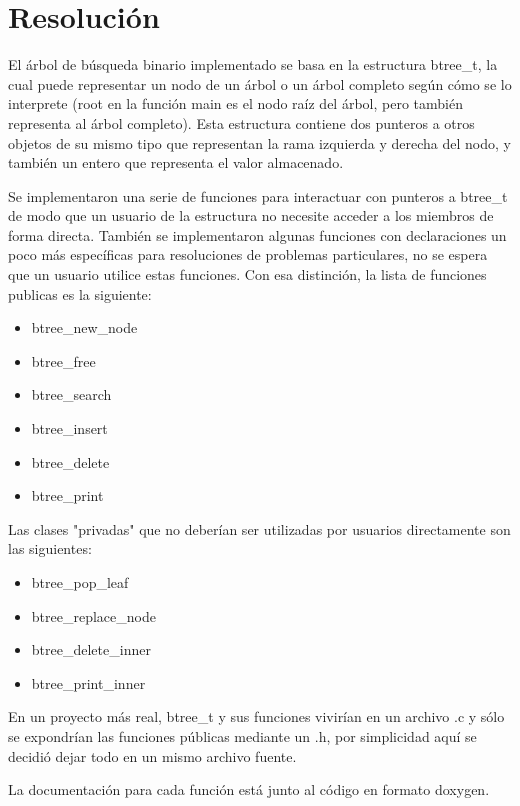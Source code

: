 \documentclass[a4paper,notitlepage]{article}
\begin{document}
\tableofcontents
\section{Resolución}
El árbol de búsqueda binario implementado se basa en la estructura btree{\_}t, la
cual puede representar un nodo de un árbol o un árbol completo según cómo se
lo interprete (root en la función main es el nodo raíz del árbol, pero también
representa al árbol completo). Esta estructura contiene dos punteros a otros
objetos de su mismo tipo que representan la rama izquierda y derecha del nodo,
y también un entero que representa el valor almacenado.

Se implementaron una serie de funciones para interactuar con punteros a btree{\_}t
de modo que un usuario de la estructura no necesite acceder a los miembros de
forma directa. También se implementaron algunas funciones con declaraciones un
poco más específicas para resoluciones de problemas particulares, no se espera
que un usuario utilice estas funciones. Con esa distinción, la lista de
funciones publicas es la siguiente:

\begin{itemize}
    \item btree{\_}new{\_}node
    \item btree{\_}free
    \item btree{\_}search
    \item btree{\_}insert
    \item btree{\_}delete
    \item btree{\_}print
\end{itemize}

Las clases "privadas" que no deberían ser utilizadas por usuarios directamente
son las siguientes:

\begin{itemize}
    \item btree{\_}pop{\_}leaf
    \item btree{\_}replace{\_}node
    \item btree{\_}delete{\_}inner
    \item btree{\_}print{\_}inner
\end{itemize}

En un proyecto más real, btree{\_}t y sus funciones vivirían en un archivo .c
y sólo se expondrían las funciones públicas mediante un .h, por simplicidad
aquí se decidió dejar todo en un mismo archivo fuente.

La documentación para cada función está junto al código en formato doxygen.
\end{document}
